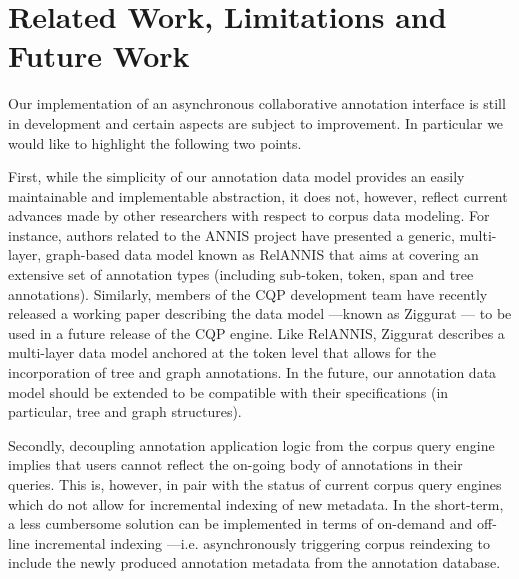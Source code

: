 \documentclass{sig-alternate}
\begin{document}
\section{Related Work, Limitations and Future Work}\label{sec:future}
Our implementation of an asynchronous collaborative annotation interface is still in development
and certain aspects are subject to improvement. In particular we would like to highlight the
following two points.

First, while the simplicity of our annotation data model provides an easily maintainable and
implementable abstraction, it does not, however, reflect current advances made by other researchers
with respect to corpus data modeling. For instance, authors related to the ANNIS project have
presented a generic, multi-layer, graph-based data model known as RelANNIS \cite{Krause2016} that
aims at covering an extensive set of annotation types (including sub-token, token, span and
tree annotations). Similarly, members of the CQP development team have recently released a working
paper describing the data model ---known as Ziggurat \cite{Evert2015}--- to be
used in a future release of the CQP engine. Like RelANNIS, Ziggurat describes a multi-layer
data model anchored at the token level that allows for the incorporation of tree and graph
annotations. In the future, our annotation data model should be extended to be compatible with their
specifications (in particular, tree and graph structures).

Secondly, decoupling annotation application logic from the corpus query engine implies that
users cannot reflect the on-going body of annotations in their queries. This is, however, in
pair with the status of current corpus query engines which do not allow for incremental indexing of
new metadata. In the short-term, a less cumbersome solution can be implemented in terms of
on-demand and off-line incremental indexing ---i.e. asynchronously triggering corpus
reindexing to include the newly produced annotation metadata from the annotation database.
\end{document}
